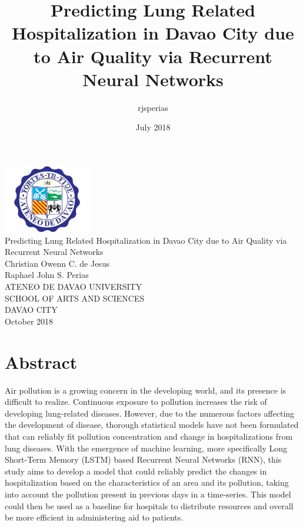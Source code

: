 \documentclass[10pt,11pt,12pt,oneside]{book}
\title{Predicting Lung Related Hospitalization in Davao City due to Air Quality via Recurrent Neural Networks}
\author{rjsperias}
\date{July 2018}
\begin{document}
\cleardoublepage
\begin{titlepage}
    \begin{center}
        \includegraphics[width=1.5in]{addu.pdf}\\
        \vspace{1cm}
        \huge{Predicting Lung Related Hospitalization  in Davao City due to Air Quality via Recurrent Neural Networks}\\
        \vspace{1.5in}
        \large{Christian Owenn C. de Jesus}\\
        \large{Raphael John S. Perias}\\
        \vspace{1.5in}
        \large{ATENEO DE DAVAO UNIVERSITY\\SCHOOL OF ARTS AND SCIENCES\\DAVAO CITY}\\
        \vspace{1in}
        October 2018
    \end{center}
\end{titlepage}
\frontmatter
\chapter*{Abstract}
Air pollution is a growing concern in the developing world, and its presence is difficult to realize. Continuous exposure to pollution increases the risk of developing lung-related diseases.
However, due to the numerous factors affecting the development of disease, thorough statistical models have not been formulated that can reliably fit pollution concentration and change in hospitalizations from lung diseases. With the emergence of machine learning, more specifically Long Short-Term Memory (LSTM) based Recurrent Neural Networks (RNN), this study aims to develop a model that could reliably predict the changes in hospitalization based on the characteristics of an area and its pollution, taking into account the pollution present in previous days in a time-series. This model could then be used as a baseline for hospitals to distribute resources and overall be more efficient in administering aid to patients.
\mainmatter
\end{document}

